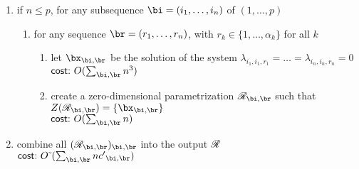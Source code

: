 \documentclass[12pt]{article}
\begin{document}
\begin{algorithm}[!t]
\begin{enumerate}
\item if $n \le p$, for any subsequence $\bi = (i_1, \ldots, i_n)$ of $(1, \ldots, p)$
  \begin{enumerate}
  \item for any sequence $\br = (r_1, \ldots, r_n)$, with $r_k \in \{1,\dots,\alpha_k\}$ for all $k$
    \begin{enumerate}
    \item let $\bx_{\bi,\br}$ be the solution of the system $\lambda_{i_1,i_1,r_1}=\dots=\lambda_{i_n,i_n,r_n}=0$\\
      $\text{\sf{cost:~}} O(\sum_{\bi,\br}n^3)$
    \item create a zero-dimensional parametrization $\scrR_{\bi,\br}$ such that $Z(\scrR_{\bi,\br})=\{\bx_{\bi,\br}\}$\\
      $\text{\sf{cost:~}} O(\sum_{\bi,\br}n)$
  \end{enumerate}
\end{enumerate}
\item combine all $(\scrR_{\bi,\br})_{\bi,\br}$ into the output $\mathscr{R}$\\
  $\text{\sf{cost:~}} \softO(\sum_{\bi,\br} n \rc_{\bi,\br})$
\end{enumerate}
\label{Row}
\end{algorithm}
\end{document}
